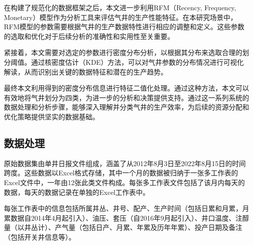 在构建了规范化的数据框架之后，本文进一步利用RFM（Recency, Frequency, Monetary）模型作为分析工具来评估气井的生产性能特征。在本研究场景中，RFM模型的参数需要根据气井的生产数据特性进行相应的调整和定义。这些参数的选取和优化对于后续分析的准确性和实用性至关重要。

紧接着，本文需要对选定的参数进行密度分布分析，以根据其分布来选取合理的划分阈值。通过核密度估计（KDE）方法，可以对气井参数的分布情况进行可视化解读，从而识别出关键的数据特征和潜在的生产趋势。

最终本文利用得到的密度分布信息进行特征二值化处理。通过这种方法，本文可以有效地将气井划分为四类，为进一步的分析和决策提供支持。通过这一系列系统的数据处理和分析步骤，能够深入理解并分类气井的生产效率，为后续的资源分配和优化策略提供坚实的数据基础。
\subsection{数据处理}
\label{cha:data}
原始数据集由单井日报文件组成，涵盖了从2012年8月3日至2022年8月15日的时间跨度。这些数据以Excel格式存储，其中一个月的数据被归纳于一张多工作表的Excel文件中，一年由12张此类文件构成。每张多工作表文件包括了该月内每天的数据，每天的数据记录在单独的Excel工作表中。

每张工作表中的信息包括所属井丛、井号、配产、生产时间（包括日累和月累，月累数据自2014年4月起引入）、油压、套压（自2016年9月起引入）、井口温度、注醇量（以井丛计）、产气量（包括日产、月累、年累及历年年累）、投产日期及备注（包括开关井信息等）。

